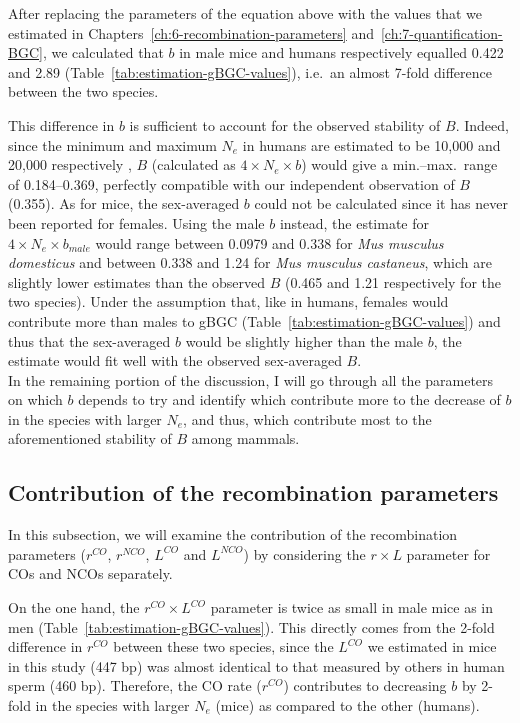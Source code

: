 After replacing the parameters of the equation above with the values that we estimated in Chapters~\ref{ch:6-recombination-parameters} and~\ref{ch:7-quantification-BGC}, we calculated that $b$ in male mice and humans respectively equalled 0.422 and 2.89 (Table~\ref{tab:estimation-gBGC-values}), i.e.\ an almost 7-fold difference between the two species.

This difference in $b$ is sufficient to account for the observed stability of $B$.
Indeed, since the minimum and maximum $N_e$ in humans are estimated to be 10,000 and 20,000 respectively \citep{charlesworth2009fundamental}, $B$ (calculated as ${4 \times N_e \times b}$) would give a min.--max.\ range of 0.184--0.369, perfectly compatible with our independent observation of $B$ (0.355).
As for mice, the sex-averaged $b$ could not be calculated since it has never been reported for females.
Using the male $b$ instead, the estimate for $4 \times N_e \times b_{male}$ would range between 0.0979 and 0.338 for \textit{Mus musculus domesticus} and between 0.338 and 1.24 for \textit{Mus musculus castaneus}, which are slightly lower estimates than the observed $B$ (0.465 and 1.21 respectively for the two species).
Under the assumption that, like in humans, females would contribute more than males to gBGC (Table~\ref{tab:estimation-gBGC-values}) and thus that the sex-averaged $b$ would be slightly higher than the male $b$, the estimate would fit well with the observed sex-averaged $B$.\\

In the remaining portion of the discussion, I will go through all the parameters on which $b$ depends to try and identify which contribute more to the decrease of $b$ in the species with larger $N_e$, and thus, which contribute most to the aforementioned stability of $B$ among mammals.


\subsection{Contribution of the recombination parameters}

In this subsection, we will examine the contribution of the recombination parameters ($r^{CO}$, $r^{NCO}$, $L^{CO}$ and $L^{NCO}$) by considering the $r \times L$ parameter for COs and NCOs separately.

On the one hand, the $r^{CO} \times L^{CO}$ parameter is twice as small in male mice as in men (Table~\ref{tab:estimation-gBGC-values}).
This directly comes from the 2-fold difference in $r^{CO}$ between these two species, since the $L^{CO}$ we estimated in mice in this study (447 bp) was almost identical to that measured by others in human sperm (460 bp).
Therefore, the CO rate ($r^{CO}$) contributes to decreasing $b$ by 2-fold in the species with larger $N_e$ (mice) as compared to the other (humans).

